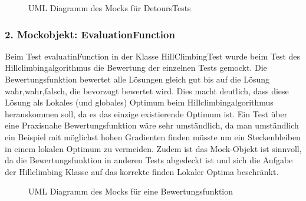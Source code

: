  \begin{figure}[H]
  \centering
  
  \caption{UML Diagramm des Mocks für DetoursTests}
\end{figure}

 
 \subsubsection{2. Mockobjekt: EvaluationFunction}
 
 Beim Test evaluatinFunction in der Klasse HillClimbingTest  wurde beim Test des Hillclimbingalgorithmus die Bewertung der einzelnen Tests gemockt. %
Die Bewertungsfunktion bewertet alle Lösungen gleich gut bis auf die Lösung wahr,wahr,falsch, die bevorzugt bewertet wird.
Dies macht deutlich, dass diese Lösung als Lokales (und globales) Optimum beim Hillclimbingalgorithmus herauskommen soll, da es das einzige existierende Optimum ist.
Ein Test über eine Praxisnahe Bewertungsfunktion wäre sehr umständlich, da man umständlich ein Beispiel mit möglichst hohen Gradienten finden müsste um ein Steckenbleiben in einem lokalen Optimum zu vermeiden. 
 Zudem ist das Mock-Objekt ist sinnvoll, da die Bewertungsfunktion in anderen Tests abgedeckt ist und sich die Aufgabe der Hillclimbing Klasse auf das korrekte finden Lokaler Optima beschränkt.
 
  \begin{figure}[H]
  \centering
  
  \caption{UML Diagramm des Mocks für eine Bewertungsfunktion}
\end{figure}
